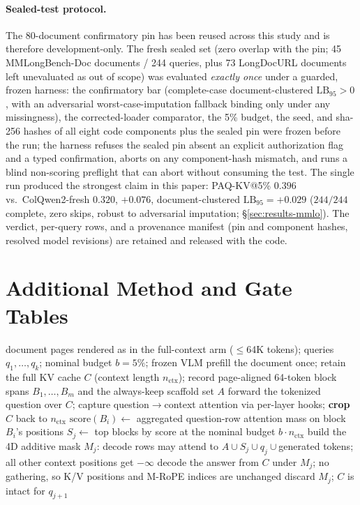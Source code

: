 \documentclass[letterpaper]{article} %
\newcommand{\paqc}{\textsc{PAQ-KV}}
\newcommand{\lb}{\mathrm{LB}_{95}}
\begin{document}
\paragraph{Sealed-test protocol.} The 80-document confirmatory pin has been reused across this study and is therefore development-only. The fresh sealed set (zero overlap with the pin; 45 MMLongBench-Doc documents / 244 queries, plus 73 LongDocURL documents left unevaluated as out of scope) was evaluated \emph{exactly once} under a guarded, frozen harness: the confirmatory bar (complete-case document-clustered $\lb>0$, with an adversarial worst-case-imputation fallback binding only under any missingness), the corrected-loader comparator, the 5\% budget, the seed, and sha-256 hashes of all eight code components plus the sealed pin were frozen before the run; the harness refuses the sealed pin absent an explicit authorization flag and a typed confirmation, aborts on any component-hash mismatch, and runs a blind non-scoring preflight that can abort without consuming the test. The single run produced the strongest claim in this paper: \paqc{}@5\% $0.396$ vs.\ ColQwen2-fresh $0.320$, $+0.076$, document-clustered $\lb=+0.029$ ($244/244$ complete, zero skips, robust to adversarial imputation; \S\ref{sec:results-mmlo}). The verdict, per-query rows, and a provenance manifest (pin and component hashes, resolved model revisions) are retained and released with the code.

\section{Additional Method and Gate Tables}\label{app:method-materials}

\begin{algorithm}[t]
\caption{\paqc{}: per-query reversible below-page KV-block selection with a 4D restricted-attention mask}
\label{alg:paqc}
\begin{algorithmic}[1]
\REQUIRE document pages rendered as in the full-context arm ($\le$64K tokens); queries $q_1,\ldots,q_k$; nominal budget $b=5\%$; frozen VLM
\STATE prefill the document once; retain the full KV cache $C$ (context length $n_{\mathrm{ctx}}$); record page-aligned 64-token block spans $B_1,\ldots,B_m$ and the always-keep scaffold set $A$
\STATE forward the tokenized question over $C$; capture question$\to$context attention via per-layer hooks; \textbf{crop} $C$ back to $n_{\mathrm{ctx}}$
\STATE $\mathrm{score}(B_i) \gets$ aggregated question-row attention mass on block $B_i$'s positions
\STATE $S_j \gets$ top blocks by score at the nominal budget $b \cdot n_{\mathrm{ctx}}$
\STATE build the 4D additive mask $M_j$: decode rows may attend to $A \cup S_j \cup q_j \cup{}$generated tokens; all other context positions get $-\infty$
\STATE decode the answer from $C$ under $M_j$; no gathering, so K/V positions and M-RoPE indices are unchanged
\STATE discard $M_j$; $C$ is intact for $q_{j+1}$
\ENDFOR
\end{algorithmic}
\end{algorithm}
\end{document}
